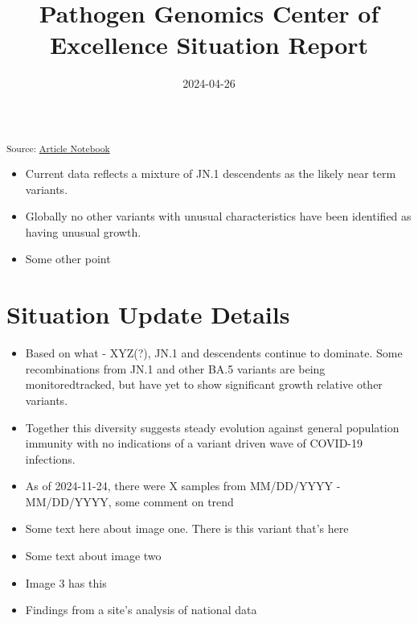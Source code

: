 \documentclass[
  twocolumn]{article}
\title{Pathogen Genomics Center of Excellence Situation Report}
\author{}
\date{2024-04-26}
\providecommand{\tightlist}{%
  \setlength{\itemsep}{0pt}\setlength{\parskip}{0pt}}\usepackage{longtable,booktabs,array}
\begin{document}
\maketitle

\textsubscript{Source:
\href{https://coe-test-org.github.io/sitrep-demo/index.qmd.html}{Article
Notebook}}

\begin{itemize}
\tightlist
\item
  Current data reflects a mixture of JN.1 descendents as the likely near
  term variants.\\
\item
  Globally no other variants with unusual characteristics have been
  identified as having unusual growth.
\item
  Some other point
\end{itemize}

\section{Situation Update Details}\label{situation-update-details}

\begin{itemize}
\tightlist
\item
  Based on what - XYZ(?), JN.1 and descendents continue to dominate.
  Some recombinations from JN.1 and other BA.5 variants are being
  monitoredtracked, but have yet to show significant growth relative
  other variants.
\item
  Together this diversity suggests steady evolution against general
  population immunity with no indications of a variant driven wave of
  COVID-19 infections.
\item
  As of 2024-11-24, there were X samples from MM/DD/YYYY - MM/DD/YYYY,
  some comment on trend
\item
  Some text here about image one. There is this variant that's here
\item
  Some text about image two
\item
  Image 3 has this
\item
  Findings from a site's analysis of national data
\end{itemize}
\end{document}
